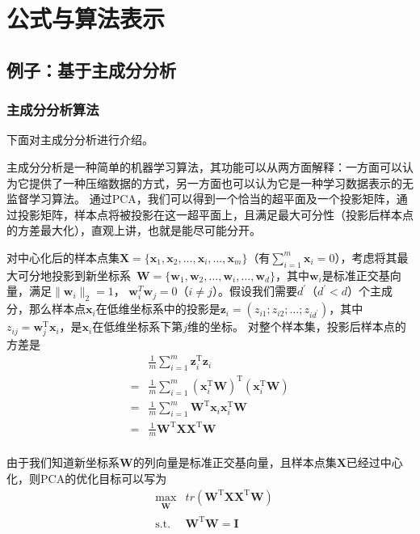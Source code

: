 \documentclass[a4paper,AutoFakeBold,oneside,12pt]{book}
\begin{document}
{{\section{公式与算法表示}

\subsection{例子：基于主成分分析}

\subsubsection{主成分分析算法}

下面对主成分分析进行介绍。

主成分分析是一种简单的机器学习算法，其功能可以从两方面解释：一方面可以认为它提供了一种压缩数据的方式，另一方面也可以认为它是一种学习数据表示的无监督学习算法。\cite{Goodfellow2016DeepLearning}
通过PCA，我们可以得到一个恰当的超平面及一个投影矩阵，通过投影矩阵，样本点将被投影在这一超平面上，且满足最大可分性（投影后样本点的方差最大化），直观上讲，也就是能尽可能分开。

对中心化后的样本点集$\bm{X}=\{\bm{x}_1,\bm{x}_2,\ldots,\bm{x}_i,\ldots,\bm{x}_m\}$（有$\sum_{i=1}^{m}\bm{x}_i = 0$），考虑将其最大可分地投影到新坐标系\ $\bm{W}= \{\bm{w}_1,\bm{w}_2,\ldots,\bm{w}_i,\ldots,\bm{w}_d\} $，其中$\bm{w}_i$是标准正交基向量，满足$\|\bm{w}_i\|_2 = 1$， $\bm{w}_i^T\bm{w}_j = 0$（$i \not= j$）。假设我们需要$d^\prime$（$d^\prime < d$）个主成分，那么样本点$\bm{x}_i$在低维坐标系中的投影是$\bm{z}_i = (z_{i1};z_{i2};\ldots;z_{id^\prime})$，其中$z_{ij} = \bm{w}_j^\mathrm{T}\bm{x}_i$，是$\bm{x}_i$在低维坐标系下第$j$维的坐标。
对整个样本集，投影后样本点的方差是
\begin{equation}
\begin{aligned}
    & \frac{1}{m}\sum_{i=1}^m \bm{z}_i^\mathrm{T}\bm{z}_i \\
= & \frac{1}{m}\sum_{i=1}^m (\bm{x}_i^\mathrm{T}\bm{W})^\mathrm{T}(\bm{x}_i^\mathrm{T}\bm{W}) \\
= & \frac{1}{m}\sum_{i=1}^m \bm{W}^\mathrm{T}\bm{x}_i\bm{x}_i^\mathrm{T}\bm{W} \\
= & \frac{1}{m} \bm{W}^\mathrm{T}\bm{X}\bm{X}^\mathrm{T}\bm{W} \\
\end{aligned}
\end{equation}

由于我们知道新坐标系$\bm{W}$的列向量是标准正交基向量，且样本点集$\bm{X}$已经过中心化，则PCA的优化目标可以写为
\begin{equation}
\label{PCA_goal}
\begin{aligned}
& \max_{\substack{\bm{W}}}  &  tr(\bm{W}^\mathrm{T}\bm{X}\bm{X}^ \mathrm{T}\bm{W}) \\
& \operatorname{ s.t. }  &  \bm{W}^\mathrm{T}\bm{W} = \bm{I} \\
\end{aligned}
\end{equation}

}}
\end{document}
